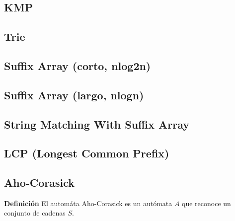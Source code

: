 \subsection{KMP}
\subsection{Trie}
\subsection{Suffix Array (corto, nlog2n)}
\subsection{Suffix Array (largo, nlogn)}
\subsection{String Matching With Suffix Array}
\subsection{LCP (Longest Common Prefix)}
\subsection{Aho-Corasick}
\textbf{Definición}
El automáta Aho-Corasick es un autómata $A$ que reconoce un conjunto de cadenas $S$.

